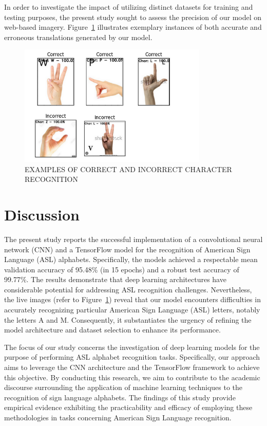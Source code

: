 \documentclass[conference]{IEEEtran}
\begin{document}
In order to investigate the impact of utilizing distinct datasets for training and testing purposes, the present study sought to assess the precision of our model on web-based imagery. Figure~\ref{Fig:Figure6} illustrates exemplary instances of both accurate and erroneous translations generated by our model.

\begin{figure}[t!]
\centering
\includegraphics[width=9cm]{Images/correct_incorrect.png}
\caption{EXAMPLES OF CORRECT AND INCORRECT CHARACTER RECOGNITION}
\label{Fig:Figure6}
\end{figure}

\section{Discussion}
The present study reports the successful implementation of a convolutional neural network (CNN) and a TensorFlow model for the recognition of American Sign Language (ASL) alphabets. Specifically, the models achieved a respectable mean validation accuracy of 95.48\% (in 15 epochs) and a robust test accuracy of 99.77\%. The results demonstrate that deep learning architectures have considerable potential for addressing ASL recognition challenges. Nevertheless, the live images (refer to Figure~\ref{Fig:Figure6}) reveal that our model encounters difficulties in accurately recognizing particular American Sign Language (ASL) letters, notably the letters A and M. Consequently, it substantiates the urgency of refining the model architecture and dataset selection to enhance its performance.

The focus of our study concerns the investigation of deep learning models for the purpose of performing ASL alphabet recognition tasks. Specifically, our approach aims to leverage the CNN architecture and the TensorFlow framework to achieve this objective. By conducting this research, we aim to contribute to the academic discourse surrounding the application of machine learning techniques to the recognition of sign language alphabets. The findings of this study provide empirical evidence exhibiting the practicability and efficacy of employing these methodologies in tasks concerning American Sign Language recognition.
\end{document}
